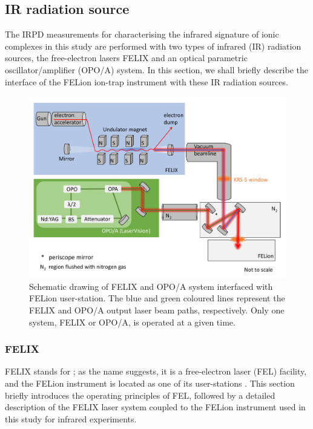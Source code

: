 \subsection{IR radiation source}
\label{subsec:ir:radiation-source}

The IRPD measurements for characterising the infrared signature of ionic complexes in this study are performed with two types of infrared (IR) radiation sources, the free-electron lasers FELIX and an optical parametric oscillator/amplifier (OPO/A) system. In this section, we shall briefly describe the interface of the FELion ion-trap instrument with these IR radiation sources.

\begin{figure}[!htb]
    \centering

    \includegraphics[width=1\textwidth]{figures/Instruments/FELIX-OPO-beamline.pdf}
    \caption{Schematic drawing of FELIX and OPO/A system interfaced with FELion user-station. The blue and green coloured lines represent the FELIX and OPO/A output laser beam paths, respectively. Only one system, FELIX or OPO/A, is operated at a given time.}
    \label{fig:FELIX}
\end{figure}

\subsubsection{FELIX} 
\label{subsec:ir:radiation-source:FELIX}

FELIX stands for ; as the name suggests, it is a free-electron laser (FEL) facility, and the FELion instrument is located as one of its user-stations \cite{jusko_felion_2019}. This section briefly introduces the operating principles of FEL, followed by a detailed description of the FELIX laser system coupled to the FELion instrument used in this study for infrared experiments.\\

